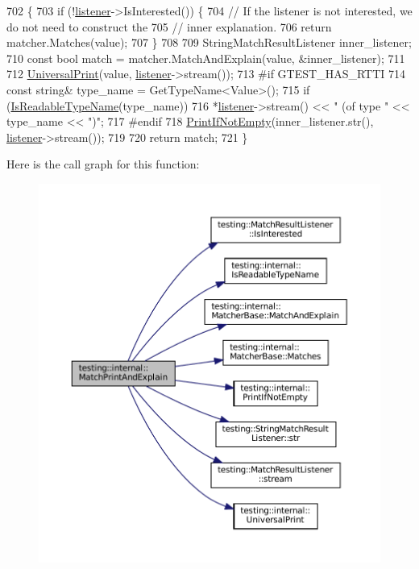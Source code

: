 \begin{DoxyCode}
702                                                          \{
703   \textcolor{keywordflow}{if} (!\hyperlink{namespaceinteractive__marker_a0e579ab555212bb5e2c9f8a675b7618a}{listener}->IsInterested()) \{
704     \textcolor{comment}{// If the listener is not interested, we do not need to construct the}
705     \textcolor{comment}{// inner explanation.}
706     \textcolor{keywordflow}{return} matcher.Matches(value);
707   \}
708 
709   StringMatchResultListener inner\_listener;
710   \textcolor{keyword}{const} \textcolor{keywordtype}{bool} match = matcher.MatchAndExplain(value, &inner\_listener);
711 
712   \hyperlink{namespacetesting_1_1internal_a30708fa2bacf11895b03bdb21eb72309}{UniversalPrint}(value, \hyperlink{namespaceinteractive__marker_a0e579ab555212bb5e2c9f8a675b7618a}{listener}->stream());
713 \textcolor{preprocessor}{#if GTEST\_HAS\_RTTI}
714   \textcolor{keyword}{const} \textcolor{keywordtype}{string}& type\_name = GetTypeName<Value>();
715   \textcolor{keywordflow}{if} (\hyperlink{namespacetesting_1_1internal_a19a5d50382569ce6ee94e2b68ddc6fc7}{IsReadableTypeName}(type\_name))
716     *\hyperlink{namespaceinteractive__marker_a0e579ab555212bb5e2c9f8a675b7618a}{listener}->stream() << \textcolor{stringliteral}{" (of type "} << type\_name << \textcolor{stringliteral}{")"};
717 \textcolor{preprocessor}{#endif}
718   \hyperlink{namespacetesting_1_1internal_afa4cd5d7933878d6d820b32c87bb2767}{PrintIfNotEmpty}(inner\_listener.str(), \hyperlink{namespaceinteractive__marker_a0e579ab555212bb5e2c9f8a675b7618a}{listener}->stream());
719 
720   \textcolor{keywordflow}{return} match;
721 \}
\end{DoxyCode}
Here is the call graph for this function\+:
\nopagebreak
\begin{figure}[H]
\begin{center}
\leavevmode
\includegraphics[width=350pt]{namespacetesting_1_1internal_a0821df2611d54c79bac990719ad8a2dd_cgraph}
\end{center}
\end{figure}
